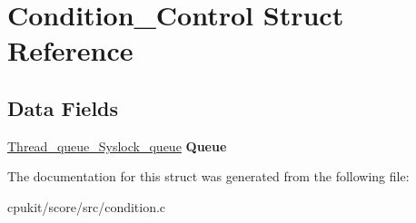 \hypertarget{structCondition__Control}{}\section{Condition\+\_\+\+Control Struct Reference}
\label{structCondition__Control}
\subsection*{Data Fields}
\begin{DoxyCompactItemize}
\item 
\mbox{\label{structCondition__Control_a06fa77dac7b8abe7018b9e1ea352c4f1}} 
\mbox{\hyperlink{structThread__queue__Syslock__queue}{Thread\+\_\+queue\+\_\+\+Syslock\+\_\+queue}} {\bfseries Queue}
\end{DoxyCompactItemize}


The documentation for this struct was generated from the following file\+:\begin{DoxyCompactItemize}
\item 
cpukit/score/src/condition.\+c\end{DoxyCompactItemize}
